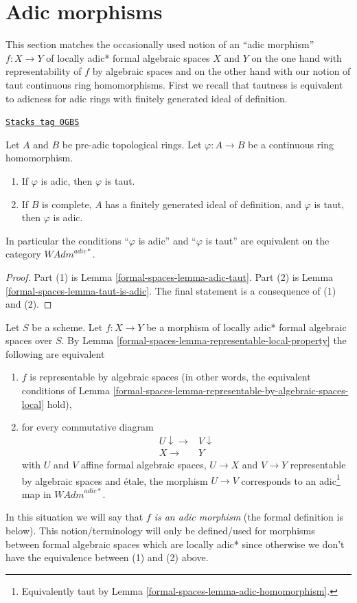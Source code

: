 \section{Adic morphisms}
\label{formal-spaces-section-adic}
This section matches the occasionally used notion of an
``adic morphism'' $f : X \to Y$ of locally adic* formal algebraic spaces
$X$ and $Y$ on the one hand with representability of $f$ by
algebraic spaces and on the other hand with our notion of
taut continuous ring homomorphisms. First we recall that
tautness is equivalent to adicness for adic rings with finitely
generated ideal of definition.

\begin{lemma}
\label{formal-spaces-lemma-adic-homomorphism}
\href{https://stacks.math.columbia.edu/tag/0GBS}{\texttt{Stacks tag 0GBS}}

Let $A$ and $B$ be pre-adic topological rings. Let
$\varphi : A \to B$ be a continuous ring homomorphism.
\begin{enumerate}
\item If $\varphi$ is adic, then $\varphi$ is taut.
\item If $B$ is complete, $A$ has a finitely generated
ideal of definition, and $\varphi$ is taut, then $\varphi$ is adic.
\end{enumerate}
In particular the conditions ``$\varphi$ is adic'' and ``$\varphi$ is taut''
are equivalent on the category $\textit{WAdm}^{adic*}$.
\end{lemma}

\begin{proof}
Part (1) is Lemma \ref{formal-spaces-lemma-adic-taut}.
Part (2) is Lemma \ref{formal-spaces-lemma-taut-is-adic}.
The final statement is a consequence of (1) and (2).
\end{proof}

Let $S$ be a scheme. Let $f : X \to Y$ be a morphism of
locally adic* formal algebraic spaces over $S$.
By Lemma \ref{formal-spaces-lemma-representable-local-property}
the following are equivalent
\begin{enumerate}
\item $f$ is representable by algebraic spaces (in other words, the
equivalent conditions of
Lemma \ref{formal-spaces-lemma-representable-by-algebraic-spaces-local} hold),
\item for every commutative diagram
$$
\begin{array}{cc}U \downarrow\longrightarrow & V \downarrow \\ X \longrightarrow & Y\end{array}
$$
with $U$ and $V$ affine formal algebraic spaces, $U \to X$ and $V \to Y$
representable by algebraic spaces and \'etale, the morphism $U \to V$
corresponds to an adic\footnote{Equivalently taut by
Lemma \ref{formal-spaces-lemma-adic-homomorphism}.} map in $\textit{WAdm}^{adic*}$.
\end{enumerate}
In this situation we will say that {\it $f$ is an adic morphism} (the formal
definition is below). This notion/terminology will only be defined/used
for morphisms between formal algebraic spaces which are locally adic*
since otherwise we don't have the equivalence between (1) and (2) above.

